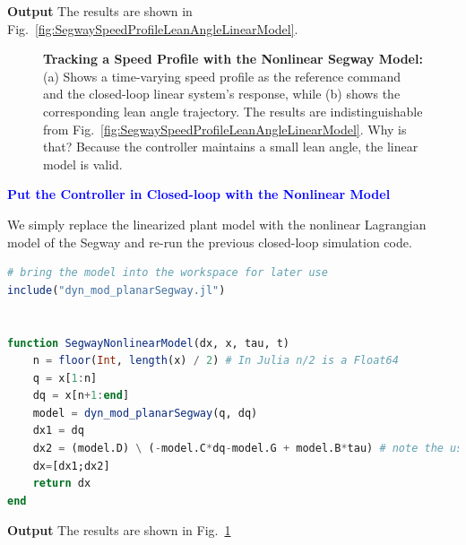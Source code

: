 \textbf{Output} 
The results are shown in Fig.~\ref{fig:SegwaySpeedProfileLeanAngleLinearModel}.

\begin{figure}[htb]%
\centering
{}%
\hfill%
%
\hfill%
    \caption[]{\textbf{Tracking a Speed Profile with the Nonlinear Segway Model:} (a) Shows a time-varying speed profile as the reference command and the closed-loop linear system's response, while (b) shows the corresponding lean angle trajectory. The results are indistinguishable from Fig.~\ref{fig:SegwaySpeedProfileLeanAngleLinearModel}. Why is that? Because the controller maintains a small lean angle, the linear model is valid.}
    \label{fig:SegwaySpeedProfileLeanAngleNonlinearModel}
\end{figure}

\bigskip
\textcolor{blue}{\bf \large Put the Controller in Closed-loop with the Nonlinear Model}
\bigskip

We simply replace the linearized plant model with the nonlinear Lagrangian model of the Segway and re-run the previous closed-loop simulation code.

\bigskip

\begin{lstlisting}[language=Julia,style=mystyle]
# bring the model into the workspace for later use
include("dyn_mod_planarSegway.jl") 


function SegwayNonlinearModel(dx, x, tau, t)
    n = floor(Int, length(x) / 2) # In Julia n/2 is a Float64
    q = x[1:n]
    dq = x[n+1:end]
    model = dyn_mod_planarSegway(q, dq)
    dx1 = dq
    dx2 = (model.D) \ (-model.C*dq-model.G + model.B*tau) # note the use of backslash
    dx=[dx1;dx2]
    return dx
end
\end{lstlisting}
\textbf{Output} 
The results are shown in Fig.~\ref{fig:SegwaySpeedProfileLeanAngleNonlinearModel}

